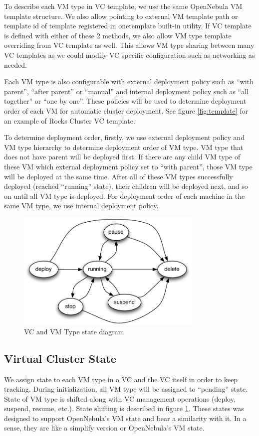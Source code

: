 \documentclass[conference]{IEEEtran}
\begin{document}
To describe each VM type in VC template, we use the same OpenNebula VM template structure.
We also allow pointing to external VM template path or template id of template registered in onetemplate built-in utility.
If VC template is defined with either of these 2 methods, we also allow VM type template overriding from VC template as well.
This allows VM type sharing between many VC templates as we could modify VC specific configuration such as networking as needed.

Each VM type is also configurable with external deployment policy such as ``with parent'', ``after parent'' or ``manual'' and internal deployment policy such as ``all together'' or ``one by one''.
These policies will be used to determine deployment order of each VM for automatic cluster deployment.
See figure \ref{fig:template} for an example of Rocks Cluster VC template.

To determine deployment order, firstly, we use external deployment policy and VM type hierarchy to determine deployment order of VM type.
VM type that does not have parent will be deployed first.
If there are any child VM type of these VM which external deployment policy set to ``with parent'', those VM type will be deployed at the same time.
After all of these VM types successfully deployed (reached ``running'' state), their children will be deployed next, and so on until all VM type is deployed.
For deployment order of each machine in the same VM type, we use internal deployment policy.

\begin{figure}[!t]
\centering
\includegraphics[width=3.5in]{state}
\caption{VC and VM Type state diagram}
\label{fig:state}
\end{figure}

\subsection{Virtual Cluster State}
We assign state to each VM type in a VC and the VC itself in order to keep tracking.
During initialization, all VM type will be assigned to ``pending'' state.
State of VM type is shifted along with VC management operations (deploy, suspend, resume, etc.).
State shifting is described in figure \ref{fig:state}.
These states was designed to support OpenNebula's VM state\cite{opennebula-state} and bear a similarity with it.
In a sense, they are like a simplify version or OpenNebula's VM state.
\end{document}
